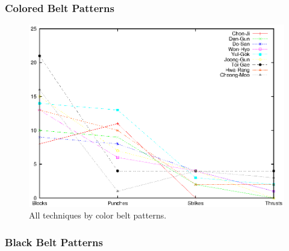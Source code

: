 \documentclass[10pt,twocolumn,a4paper]{article}
\begin{document}
  \subsubsection{Colored Belt Patterns}

  \begin{figure}
    \includegraphics[scale=0.72]{data/gnuplot/eps/patterns_color_all}
    \caption{All techniques by color belt patterns.}
    \label{fig:patterns_color_all}
  \end{figure}













  \subsubsection{Black Belt Patterns}
\end{document}
